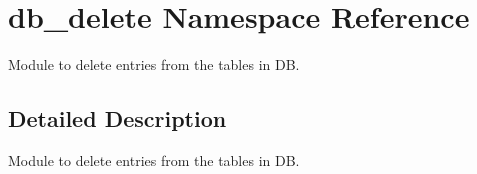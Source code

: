 \hypertarget{namespacedb__delete}{\section{db\-\_\-delete Namespace Reference}
\label{namespacedb__delete}
}


Module to delete entries from the tables in D\-B.  




\subsection{Detailed Description}
Module to delete entries from the tables in D\-B. 